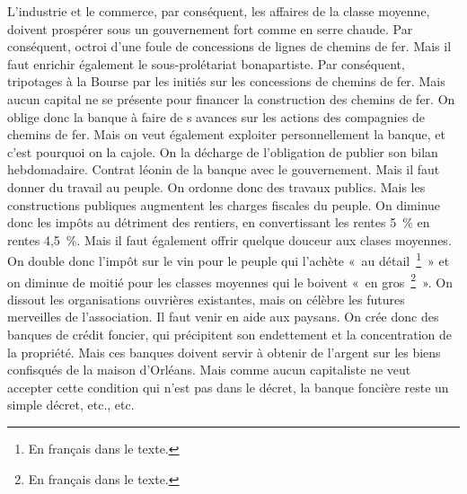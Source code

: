 \documentclass[french,twoside]{book} %
\begin{document}
L’industrie et le commerce, par conséquent, les affaires de la classe moyenne, doivent prospérer sous un gouvernement fort comme en serre chaude. Par conséquent, octroi d’une foule de concessions de lignes de chemins de fer. Mais il faut enrichir également le sous-prolétariat bonapartiste. Par conséquent, tripotages à la Bourse par les initiés sur les concessions de chemins de fer. Mais aucun capital ne se présente pour financer la construction des chemins de fer. On oblige donc la banque à faire de s avances sur les actions des compagnies de chemins de fer. Mais on veut également exploiter personnellement la banque, et c’est pourquoi on la cajole. On la décharge de l’obligation de publier son bilan hebdomadaire. Contrat léonin de la banque avec le gouvernement. Mais il faut donner du travail au peuple. On ordonne donc des travaux publics. Mais les constructions publiques augmentent les charges fiscales du peuple. On diminue donc les impôts au détriment des rentiers, en convertissant les rentes 5 \% en rentes 4,5 \%. Mais il faut également offrir quelque douceur aux clases moyennes. On double donc l’impôt sur le vin pour le peuple qui l’achète « au détail \footnote{En français dans le texte.} » et on diminue de moitié pour les classes moyennes qui le boivent « en gros \footnote{En français dans le texte.} ». On dissout les organisations ouvrières existantes, mais on célèbre les futures merveilles de l’association. Il faut venir en aide aux paysans. On crée donc des banques de crédit foncier, qui précipitent son endettement et la concentration de la propriété. Mais ces banques doivent servir à obtenir de l’argent sur les biens confisqués de la maison d’Orléans. Mais comme aucun capitaliste ne veut accepter cette condition qui n’est pas dans le décret, la banque foncière reste un simple décret, etc., etc.\par
\end{document}
